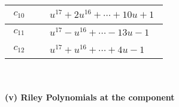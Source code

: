 \documentclass[1p]{elsarticle_modified}
\theoremstyle{definition}
\begin{document}
\begin{tabular}{m{50pt}|m{274pt}}
\hline $$\begin{aligned}c_{10}\end{aligned}$$&$\begin{aligned}
&u^{17}+2 u^{16}+\cdots+10 u+1
\end{aligned}$\\
\hline $$\begin{aligned}c_{11}\end{aligned}$$&$\begin{aligned}
&u^{17}- u^{16}+\cdots-13 u-1
\end{aligned}$\\
\hline $$\begin{aligned}c_{12}\end{aligned}$$&$\begin{aligned}
&u^{17}+u^{16}+\cdots+4 u-1
\end{aligned}$\\
\hline
\end{tabular}\\~\\
\newpage\renewcommand{\arraystretch}{1}
\flushleft \textbf{(v) Riley Polynomials at the component}\newline \\
\end{document}
